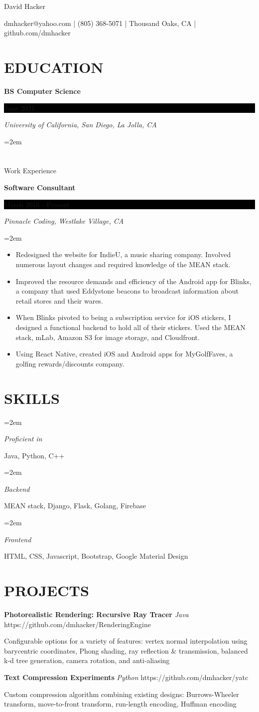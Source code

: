 \documentclass[fontsize=11pt]{article}
\newlength{\spacebox}
\newcommand{\sepspace}{\vspace*{1em}}   %
\newcommand{\MyName}[1]{ %
    \Huge \usefont{OT1}{phv}{b}{n} \hfill #1
    \par \normalsize \normalfont}
\newcommand{\NewPart}[1]{\section*{\uppercase{#1}}}
\newcommand{\PersonalEntry}[2]{
    \noindent\hangindent=2em\hangafter=0 %
    \parbox{\spacebox}{                  %
    \textit{#1}}                      %
    \hspace{1.5em} #2 \par}              %
\newcommand{\SkillsEntry}[2]{                %
    \noindent\hangindent=2em\hangafter=0 %
    \parbox{\spacebox}{                  %
    \textit{#1}}                    %
    \hspace{1.5em} #2 \par}              %
\newcommand{\EducationEntry}[4]{
    \noindent \textbf{#1} \hfill      %
    \colorbox{Black}{
      \parbox{8.5em}{
      \hfill\color{White}#2}} \par  %
    \noindent \textit{#3} \par        %
    \noindent\hangindent=2em\hangafter=0 \small #4 %
    \normalsize \par}
\newcommand{\WorkEntry}[4]{       %
    \noindent \textbf{#1} \hfill      %
    \colorbox{Black}{%
      \parbox{9em}{%
      \hfill\color{White}#2}} \par   %
        \noindent \textit{#3} \par        %
    \noindent\hangindent=2em\hangafter=0 \small #4 %
    \normalsize \par}
\newcommand{\ProjectEntry}[4]{         %
    \noindent \textbf{#1} \noindent \textit{#3} \hfill {#2} \par
    \noindent \small #4 %
    \normalsize \par}
\begin{document}
\MyName{David Hacker}
\bigskip
{\small \hfill dmhacker@yahoo.com | (805) 368-5071 | Thousand Oaks, CA | github.com/dmhacker}
    
\NewPart{Education}{}
\EducationEntry
{BS Computer Science}
{June 2021}
{University of California, San Diego, La Jolla, CA}
  
\NewPart{Work Experience}{}

\WorkEntry
{Software Consultant}
{March 2016 - Present}
{Pinnacle Coding, Westlake Village, CA}
{\begin{itemize} \itemsep -1pt
	\item Redesigned the website for IndieU, a music sharing company. Involved numerous layout changes and required knowledge of the MEAN stack.
	\item Improved the resource demands and efficiency of the Android app for Blinks, a company that used Eddystone beacons to broadcast information about retail stores and their wares.
	\item When Blinks pivoted to being a subscription service for iOS stickers, I designed a functional backend to hold all of their stickers. Used the MEAN stack, mLab, Amazon S3 for image storage, and Cloudfront.
	\item Using React Native, created iOS and Android apps for MyGolfFaves, a golfing rewards/discounts company.
	\end{itemize}}
\NewPart{Skills}{}
\SkillsEntry{Proficient in}{Java, Python, C++}
\SkillsEntry{Backend}{MEAN stack, Django, Flask, Golang, Firebase}
\SkillsEntry{Frontend}{HTML, CSS, Javascript, Bootstrap, Google Material Design}
\NewPart{Projects}{}

\ProjectEntry{Photorealistic Rendering: Recursive Ray Tracer}{https://github.com/dmhacker/RenderingEngine}
{Java}
{Configurable options for a variety of features: vertex normal interpolation using barycentric coordinates, Phong shading, ray reflection \& transmission, balanced k-d tree generation, camera rotation, and anti-aliasing}
\sepspace

\ProjectEntry{Text Compression Experiments}{https://github.com/dmhacker/yatc}
{Python}
{Custom compression algorithm combining existing designs: Burrows-Wheeler transform, move-to-front transform, run-length encoding, Huffman encoding}
\sepspace
\end{document}
